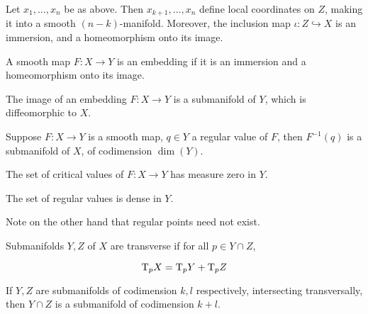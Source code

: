 \begin{lemma}
    Let \(x_1, \dots, x_n\) be as above. Then \(x_{k+1},\dots, x_n\) define local coordinates on \(Z\), making it into a smooth \((n-k)\)-manifold. Moreover, the inclusion map \(\iota : Z \hookrightarrow X\) is an immersion, and a homeomorphism onto its image.
\end{lemma}

\begin{definition}
    [embedding] A smooth map \(F : X \to Y\) is an embedding if it is an immersion and a homeomorphism onto its image.
\end{definition}

\begin{lemma}
    The image of an embedding \(F : X \to Y\) is a submanifold of \(Y\), which is diffeomorphic to \(X\).
\end{lemma}

\begin{proposition}
    Suppose \(F : X \to Y\) is a smooth map, \(q \in Y\) a regular value of \(F\), then \(F^{-1}(q)\) is a submanifold of \(X\), of codimension \(\dim(Y)\).
\end{proposition}

\begin{theorem}
    [Sard] The set of critical values of \(F : X \to Y\) has measure zero in \(Y\).
\end{theorem}

\begin{corollary}
    The set of regular values is dense in \(Y\).
\end{corollary}

\begin{remark}
    Note on the other hand that regular points need not exist.
\end{remark}

\begin{definition}
    [transverse]

    Submanifolds \(Y, Z\) of \(X\) are transverse if for all \(p \in Y \cap Z\),

    \[\mathrm{T}_pX = \mathrm{T}_p Y + \mathrm{T}_pZ\]
\end{definition}

\begin{proposition}
    If \(Y, Z\) are submanifolds of codimension \(k, l\) respectively, intersecting transversally, then \(Y \cap Z\) is a submanifold of codimension \(k+l\).
\end{proposition}
